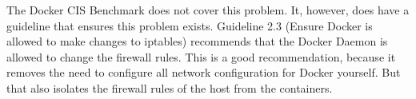 \hfill

The Docker CIS Benchmark does not cover this problem. It, however, does have a guideline that ensures this problem exists. Guideline 2.3 (Ensure Docker is allowed to make changes to iptables) recommends that the Docker Daemon is allowed to change the firewall rules. This is a good recommendation, because it removes the need to configure all network configuration for Docker yourself. But that also isolates the firewall rules of the host from the containers.
